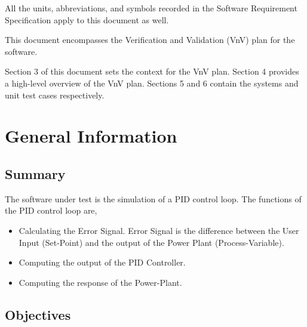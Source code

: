 \documentclass[12pt, titlepage]{article}
\begin{document}
All the units, abbreviations, and symbols recorded in the Software Requirement 
Specification \cite{SRS} apply to this document as well.

\newpage


This document encompasses the Verification and Validation (VnV) plan for the
\progname{} software. 

Section 3 of this document sets the context for the VnV plan. Section 4  provides
a high-level overview of the VnV plan. Sections 5 and 6 contain the systems and 
unit test cases respectively. 


\section{General Information}

\subsection{Summary}


The software under test is the simulation of a PID control loop. The functions of 
the PID control loop are,

\begin{itemize}
\item Calculating the Error Signal. Error Signal is the difference between the User 
Input (Set-Point) and the output of the Power Plant (Process-Variable).
\item Computing the output of the PID Controller.
\item Computing the response of the Power-Plant.
\end{itemize}

\subsection{Objectives}

  
\end{document}
